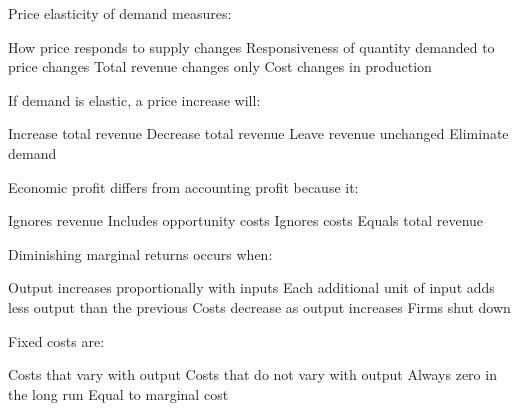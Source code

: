 \documentclass[12pt]{exam}
\begin{document}
\begin{questions}
    \begin{mcquestion}[2]
        Price elasticity of demand measures:
        \begin{choices}
            \choice How price responds to supply changes
            \CorrectChoice Responsiveness of quantity demanded to price changes
            \choice Total revenue changes only
            \choice Cost changes in production
        \end{choices}
    \end{mcquestion}

    \begin{mcquestion}[2]
        If demand is elastic, a price increase will:
        \begin{choices}
            \choice Increase total revenue
            \CorrectChoice Decrease total revenue
            \choice Leave revenue unchanged
            \choice Eliminate demand
        \end{choices}
    \end{mcquestion}

    \begin{mcquestion}[2]
        Economic profit differs from accounting profit because it:
        \begin{choices}
            \choice Ignores revenue
            \CorrectChoice Includes opportunity costs
            \choice Ignores costs
            \choice Equals total revenue
        \end{choices}
    \end{mcquestion}

    \begin{mcquestion}[2]
        Diminishing marginal returns occurs when:
        \begin{choices}
            \choice Output increases proportionally with inputs
            \CorrectChoice Each additional unit of input adds less output than the previous
            \choice Costs decrease as output increases
            \choice Firms shut down
        \end{choices}
    \end{mcquestion}

    \begin{mcquestion}[2]
        Fixed costs are:
        \begin{choices}
            \choice Costs that vary with output
            \CorrectChoice Costs that do not vary with output
            \choice Always zero in the long run
            \choice Equal to marginal cost
        \end{choices}
    \end{mcquestion}


\end{questions}
\end{document}
